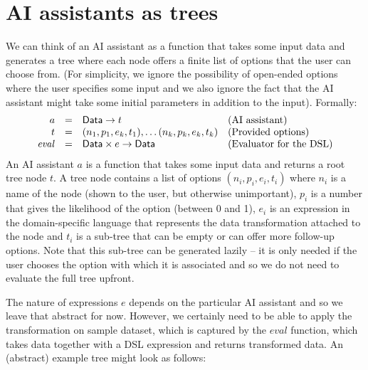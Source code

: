 \documentclass{article}
\begin{document}
\section{AI assistants as trees}
We can think of an AI assistant as a function that takes some input data and generates
a tree where each node offers a finite list of options that the user can choose from. (For
simplicity, we ignore the possibility of open-ended options where the user specifies some input 
and we also ignore the fact that the AI assistant might take some initial parameters in addition
to the input). Formally:
%
\begin{equation*}
\begin{array}{rcll}
a &=& \textnormal{\sffamily Data} \rightarrow t &\textnormal{(AI assistant)}\\
t &=& (n_1, p_1, e_k, t_1), \ldots (n_k, p_k, e_k, t_k) &\textnormal{(Provided options)}\\
\mathit{eval} &=& \textnormal{\sffamily Data}\times e \rightarrow \textnormal{\sffamily Data}&\textnormal{(Evaluator for the DSL)}
\end{array}
\end{equation*}
%
An AI assistant $a$ is a function that takes some input data and returns a root tree node $t$. 
A tree node contains a list of options $(n_i, p_i, e_i, t_i)$ where $n_i$ is a name of the node (shown
to the user, but otherwise unimportant), $p_i$ is a number that gives the likelihood of the 
option (between 0 and 1), $e_i$ is an expression in the domain-specific language that represents
the data transformation attached to the node and $t_i$ is a sub-tree that can be empty or can offer 
more follow-up options. Note that this sub-tree can be generated lazily -- it is only needed if the 
user chooses the option with which it is associated and so we do not need to evaluate the full tree 
upfront.

The nature of expressions $e$ depends on the particular AI assistant and so we leave that abstract
for now. However, we certainly need to be able to apply the transformation on sample dataset, 
which is captured by the $\mathit{eval}$ function, which takes data together with a DSL expression
and returns transformed data. An (abstract) example tree might look as follows:
\end{document}
